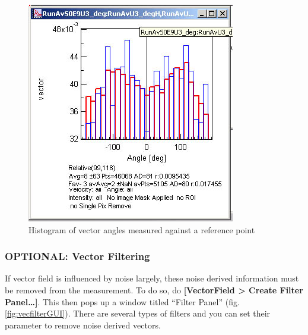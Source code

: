\documentclass{article}
\begin{document}

\begin{figure}[!ht]
\begin{center}
\includegraphics[scale=0.4]{img/directionhist_relative.jpg}
\caption{ Histogram of vector angles measured against a reference point}
\label{fig:relativeAngleHIst}
\end{center}
\end{figure}


\subsubsection{OPTIONAL: Vector Filtering} 

If vector field is influenced by noise largely,
  these noise derived information must be removed from the measurement.
  To do so, do \textbf{{[}VectorField \textgreater{} Create Filter
  Panel\ldots{}{]}}. This then pops up a window titled ``Filter Panel'' (fig. \ref{fig:vecfilterGUI}).
  There are several types of filters and you can set their parameter to
  remove noise derived vectors.
%
%
\end{document}
